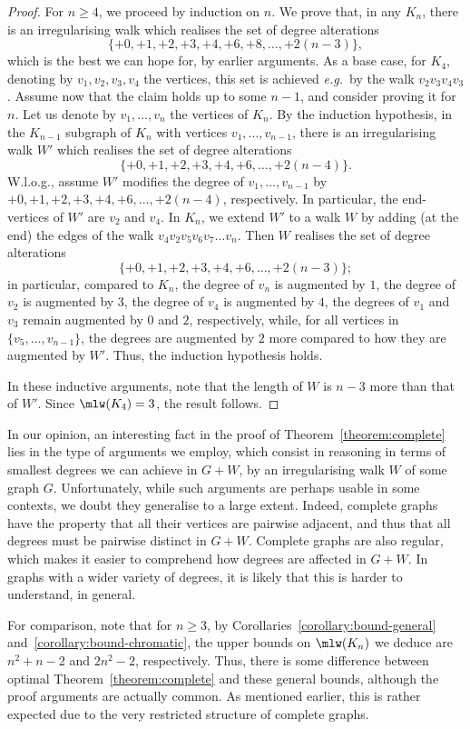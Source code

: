 \documentclass[a4paper,11pt,dvipsnames]{elsarticle}
\newcommand{\sam}[1]{\todo[size=\tiny,color=red!20!white]{\textbf{Sam:} #1}}
\newcommand{\sam}[1]{}
\begin{document}
\begin{proof}
For $n \geq 4$, we proceed by induction on $n$.
We prove that, in any $K_n$, there is an irregularising walk which realises the set of degree alterations $$\{+0,+1,+2,+3,+4,+6,+8,\dots,+2(n-3)\},$$ which is the best we can hope for, by earlier arguments. As a base case, for $K_4$, denoting by $v_1,v_2,v_3,v_4$ the vertices, this set is achieved \textit{e.g.}~by the walk $v_2v_3v_4v_3$. Assume now that the claim holds up to some $n-1$, and consider proving it for $n$. Let us denote by $v_1,\dots,v_n$ the vertices of $K_n$. By the induction hypothesis, in the $K_{n-1}$ subgraph of $K_n$ with vertices $v_1,\dots,v_{n-1}$, there is an irregularising walk $W'$ which realises the set of degree alterations $$\{+0,+1,+2,+3,+4,+6,\dots,+2(n-4)\}.$$ W.l.o.g., assume $W'$ modifies the degree of $v_1,\dots,v_{n-1}$ by $+0,+1,+2,+3,+4,+6,\dots,+2(n-4)$, respectively. 
In particular, the end-vertices of $W'$ are $v_2$ and $v_4$. In $K_n$, we extend $W'$ to a walk $W$ by adding (at the end) the edges of the walk $v_4v_2v_5v_6v_7 \dots v_n$. Then $W$ realises the set of degree alterations $$\{+0,+1,+2,+3,+4,+6,\dots,+2(n-3)\};$$ in particular, compared to $K_n$, the degree of $v_n$ is augmented by $1$, the degree of $v_2$ is augmented by $3$, the degree of $v_4$ is augmented by $4$, the degrees of $v_1$ and $v_3$ remain augmented by $0$ and $2$, respectively, while, for all vertices in $\{v_5,\dots,v_{n-1}\}$, the degrees are augmented by $2$ more compared to how they are augmented by $W'$. Thus, the induction hypothesis holds.

In these inductive arguments, note that the length of $W$ is $n-3$ more than that of $W'$. Since $\mlw(K_4)=3$, the result follows.
\end{proof}

In our opinion, an interesting fact in the proof of Theorem~\ref{theorem:complete} lies in the type of arguments we employ, which consist in reasoning in terms of smallest degrees we can achieve in $G+W$, by an irregularising walk $W$ of some graph $G$. Unfortunately, while such arguments are perhaps usable in some contexts, we doubt they generalise to a large extent. Indeed, complete graphs have the property that all their vertices are pairwise adjacent, and thus that all degrees must be pairwise distinct in $G+W$. Complete graphs are also regular, which makes it easier to comprehend how degrees are affected in $G+W$. In graphs with a wider variety of degrees, it is likely that this is harder to understand, in general.

For comparison, note that for $n \geq 3$, by Corollaries~\ref{corollary:bound-general} and~\ref{corollary:bound-chromatic}, the upper bounds on $\mlw(K_n)$ we deduce are $n^2+n-2$ and $2n^2-2$, respectively. 
Thus, there is some difference between optimal Theorem~\ref{theorem:complete} and these general bounds,
although the proof arguments are actually common.
As mentioned earlier, this is rather expected due to the very restricted structure of complete graphs. 
\end{document}
